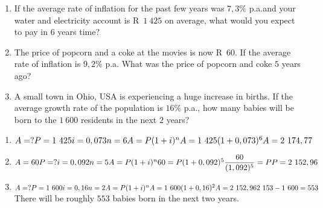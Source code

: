 \begin{exercises}{}{
    \begin{enumerate}[label=\textbf{\arabic*}.]
	\item If the average rate of inflation for the past few years was $7,3\%$ p.a.\@ and your water and electricity account is R~$1~425$ on average, what would you expect to pay in $6$ years time?
	\item The price of popcorn and a coke at the movies is now R~$60$. If the average rate of inflation is $9,2\%$ p.a. What was the price of popcorn and coke $5$ years ago?
	\item A small town in Ohio, USA is experiencing a huge increase in births. If the average growth rate of the population is $16\%$ p.a., how many babies will be born to the $1~600$ residents in the next $2$ years?\\
    \end{enumerate}
}
\end{exercises}


 \begin{solutions}{}{
\begin{enumerate}[itemsep=5pt, label=\textbf{\arabic*}. ] 


\item $A = ?\\
P=1~425\\
i=0,073\\
n=6\\
A=P(1 + i)^{n}\\
A = 1~425(1 + 0,073)^{6}\\
A = 2~174,77$
\item $A = 60\\
P=?\\
i=0,092\\
n=5\\
A=P(1 + i)^{n}\\
60 = P(1 + 0,092)^{5}\\
\dfrac{60}{(1,092)^5}=P\\
P = 2~152,96$
\item $A = ?\\
P=1~600\\
i=0,16\\
n=2\\
A=P(1 + i)^{n}\\
A = 1~600(1 + 0,16)^{2}\\
A = 2~152,96\\
2~153-1~600=553$
There will be roughly $553$ babies born in the next two years.
\end{enumerate}}
\end{solutions}


